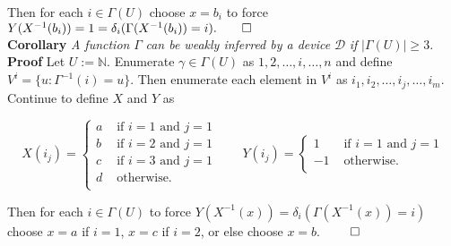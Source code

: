 \documentclass[11pt]{article}
\newcommand{\N}{\mathbb{N}}
\begin{document}
Then for each $ i \in \Gamma(U) $ choose $ x = b_i $ to force $ Y(X^{-1}(b_i)) = 1 = \delta_{i}(\Gamma(X^{-1}(b_i)) = i). \hfill \qed $ \\

\bigskip   
\textbf{Corollary} \; \textit{A function} $ \Gamma $ \textit{can be weakly inferred by a device} $ \mathcal{D} $ \textit{if} $ |\Gamma(U)| \geq 3 $.  \\
\textbf{Proof} \; Let $ U := \N $. Enumerate $ \gamma \in \Gamma(U) $ as $ 1, 2, \dots, i, \dots, n $ and define $ V^{i} = \{u: \Gamma^{-1}(i) = u \} $. Then enumerate each element in $ V^i $ as $ i_1, i_2, \dots, i_j, \dots, i_m $. Continue to define $ X $ and $ Y $ as 

\begin{equation*}
X(i_j) = \begin{cases}
       a & \text{ if } i = 1 \text{ and } j = 1 \\
       b & \text{ if } i = 2 \text{ and } j = 1 \\
       c & \text{ if } i = 3 \text{ and } j = 1 \\
       d & \text{ otherwise. } \\
       \end{cases} \quad \quad 
Y(i_j) = \begin{cases}
       1 & \text{ if } i = 1 \text{ and } j = 1 \\
       -1 & \text{ otherwise. } \\
       \end{cases} 
\end{equation*}

Then for each $ i \in \Gamma(U) $ to force $ Y(X^{-1}(x)) = \delta_{i}(\Gamma(X^{-1}(x)) = i) $ choose $ x = a $ if $ i = 1 $, $ x = c $ if $ i = 2 $, or else choose $ x = b $. $ \hfill \qed $ \\
\end{document}

